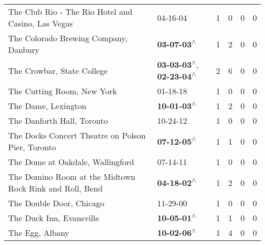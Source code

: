 \begin{supertabular}{p{0.4\textwidth}p{0.3\textwidth}p{0.05\textwidth}p{0.05\textwidth}p{0.05\textwidth}p{0.05\textwidth}}
                           The Club Rio - The Rio Hotel and Casino, Las Vegas &                                                                  04-16-04\textsuperscript{} &  1 &  0 &  0 &  0 \\
                                        The Colorado Brewing Company, Danbury &                                                 \textbf{03-07-03\textsuperscript{$\wedge$}} &  1 &  2 &  0 &  0 \\
                                                   The Crowbar, State College &    \textbf{03-03-03\textsuperscript{$\wedge$}}, \textbf{02-23-04\textsuperscript{$\wedge$}} &  2 &  6 &  0 &  0 \\
                                                   The Cutting Room, New York &                                                                  01-18-18\textsuperscript{} &  1 &  0 &  0 &  0 \\
                                                          The Dame, Lexington &                                                 \textbf{10-01-03\textsuperscript{$\wedge$}} &  1 &  2 &  0 &  0 \\
                                                   The Danforth Hall, Toronto &                                                                  10-24-12\textsuperscript{} &  1 &  0 &  0 &  0 \\
                            The Docks Concert Theatre on Polson Pier, Toronto &                                                 \textbf{07-12-05\textsuperscript{$\wedge$}} &  1 &  1 &  0 &  0 \\
                                             The Dome at Oakdale, Wallingford &                                                                  07-14-11\textsuperscript{} &  1 &  0 &  0 &  0 \\
                      The Domino Room at the Midtown Rock Rink and Roll, Bend &                                                 \textbf{04-18-02\textsuperscript{$\wedge$}} &  1 &  2 &  0 &  0 \\
                                                     The Double Door, Chicago &                                                                  11-29-00\textsuperscript{} &  1 &  0 &  0 &  0 \\
                                                     The Duck Inn, Evansville &                                                 \textbf{10-05-01\textsuperscript{$\wedge$}} &  1 &  1 &  0 &  0 \\
                                                              The Egg, Albany &                                                 \textbf{10-02-06\textsuperscript{$\wedge$}} &  1 &  4 &  0 &  0 \\

\end{supertabular}
